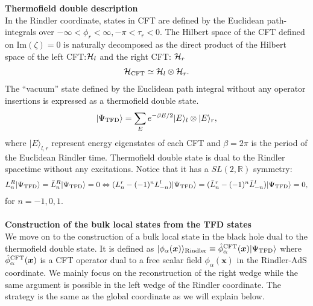 \documentclass[11pt,a4paper]{article}
\def\a{{\alpha}}
\def\ba{\begin{eqnarray}}
\def\ea{\end{eqnarray}}
\def\LR{\Leftrightarrow}
\def\lb{\rangle}
\begin{document}
\textbf{Thermofield double description}\\
In the Rindler coordinate, states in CFT are defined by the Euclidean path-integrals over $ -\infty<\phi_r<\infty,-\pi<\tau_r<0$. The Hilbert space of the CFT defined on Im$(\zeta)=0$ is naturally decomposed as the direct product of the Hilbert space of the left CFT:${\cal H}_l$ and the right CFT: ${\cal H}_r$
\ba
{\cal H}_{\rm CFT}\simeq{\cal H}_l\otimes {\cal H}_r.
\ea
The ``vacuum'' state defined by the Euclidean path integral without any operator insertions is expressed as a thermofield double state.%
\ba
|\Psi_{\rm TFD}\lb=\sum_{E}e^{-\beta E/2}|E\lb_{l}\otimes|E\lb_{r},\label{tfd}
\ea
where $|E\lb_{l,r}$ represent energy eigenstates of each CFT and $\beta=2\pi$ is the period of the Euclidean Rindler time. Thermofield double state is dual to the Rindler spacetime without any excitations. Notice that it has a $SL(2,\mathbb{R})$ symmetry:
\ba
L^{R}_n|\Psi_{\rm TFD}\lb=\bar{L}^{R}_n|\Psi_{\rm TFD}\lb=0\LR (L^{r}_{n}-(-1)^{n}L^{l}_{-n})|\Psi_{\rm TFD}\lb=(\bar{L}^{r}_{n}-(-1)^{n}\bar{L}^{l}_{-n})|\Psi_{\rm TFD}\lb=0\nonumber,
\ea
for $n=-1,0,1$.\\ \\
\textbf{Construction of the bulk local states from the TFD states}\\
We move on to the construction of a bulk local state in the black hole dual to the thermofield double state. It is defined as $|\phi_\a(\boldsymbol{x})\lb_{\rm Rindler}\equiv \hat{\phi}^{\rm CFT}_\a(\boldsymbol{x})|\Psi_{\rm TFD}\lb$ where $\hat{\phi}^{\rm CFT}_\a(\boldsymbol{x})$ is a CFT operator dual to a free scalar field $\phi_{\a}(\boldsymbol{x})$ in the Rindler-AdS coordinate. We mainly focus on the reconstruction of the right wedge while the same argument is possible in the left wedge of the Rindler coordinate. The strategy is the same as the global coordinate as we will explain below.
\end{document}

